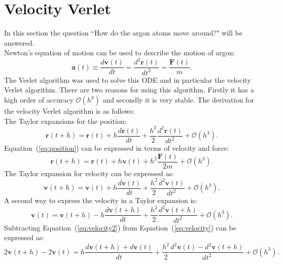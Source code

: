 \documentclass[12pt,a4paper]{report}
\begin{document}
\section{Velocity Verlet}
In this section the question ``How do the argon atoms move around?" will be answered.\\
Newton's equation of motion can be used to describe the motion of argon:
\begin{equation}\label{eq:newtonmotion}
\boldsymbol{a}(t) \equiv \frac{d\boldsymbol{v}(t)}{dt}=\frac{d^2\boldsymbol{r}(t)}{dt^2}=\frac{\boldsymbol{F}(t)}{m}\text{.}
\end{equation}
The Verlet algorithm was used to solve this ODE and in particular the velocity Verlet algorithm. There are two reasons for using this algorithm. Firstly it has a high order of accuracy $\mathcal{O}(h^3)$ and secondly it is very stable. The derivation for the velocity Verlet algorithm is as follows:\\
The Taylor expansions for the position:
\begin{equation}\label{eq:position}
\boldsymbol{r}(t+h) = \boldsymbol{r}(t) + h\frac{d\boldsymbol{r}(t)}{dt} + \frac{h^2}{2}\frac{d^2\boldsymbol{r}(t)}{dt^2}+\mathcal{O}(h^3)\text{.}
\end{equation}
Equation~(\ref{eq:position}) can be expressed in terms of velocity and force:
\begin{equation}\label{eq:position2}
\boldsymbol{r}(t+h) = \boldsymbol{r}(t) + h\boldsymbol{v}(t) + h^2\frac{\boldsymbol{F}(t)}{2m}+\mathcal{O}(h^3)\text{.}
\end{equation}
The Taylor expansion for velocity can be expressed as:
\begin{equation}\label{eq:velocity}
\boldsymbol{v}(t+h) = \boldsymbol{v}(t) + h\frac{d\boldsymbol{v}(t)}{dt} + \frac{h^2}{2}\frac{d^2\boldsymbol{v}(t)}{dt^2}+\mathcal{O}(h^3)\text{.}
\end{equation}
A second way to express the velocity in a Taylor expansion is:
\begin{equation}\label{eq:velocity2}
\boldsymbol{v}(t) = \boldsymbol{v}(t+h) - h\frac{d\boldsymbol{v}(t+h)}{dt} + \frac{h^2}{2}\frac{d^2\boldsymbol{v}(t+h)}{dt^2}+\mathcal{O}(h^3)\text{.}
\end{equation}
Subtracting Equation~(\ref{eq:velocity2}) from Equation~(\ref{eq:velocity}) can be expressed as:
\begin{equation}\label{eq:velocity3}
2\boldsymbol{v}(t+h)-2\boldsymbol{v}(t) =  h\frac{d\boldsymbol{v}(t+h)+d\boldsymbol{v}(t)}{dt} + \frac{h^2}{2}\frac{d^2\boldsymbol{v}(t)-d^2\boldsymbol{v}(t+h)}{dt^2}+\mathcal{O}(h^3)\text{.}
\end{equation}
\end{document}

